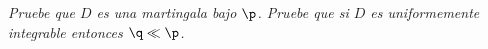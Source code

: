 \emph{
	Pruebe que $D$ es una martingala bajo $\p$. Pruebe que si 
	$D$ es uniformemente integrable entonces $\q\ll\p$.
}